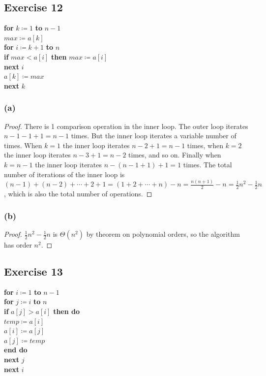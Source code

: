 \documentclass[14pt]{extarticle}
\begin{document}
\subsection{Exercise 12}
\begin{tabbing}
{\bf for} \= \(k \coloneqq 1\) {\bf to} \(n-1\) \\
          \> \(max \coloneqq a[k]\) \\
          \> {\bf for} \= \(i \coloneqq k+1\) {\bf to} \(n\)\\
          \>           \> {\bf if} \(max < a[i]\) {\bf then} \(max \coloneqq a[i]\) \\
          \> {\bf next} \(i\) \\
\(a[k] \coloneqq max\) \\
{\bf next} \(k\)
\end{tabbing}

\subsubsection{(a)}
\begin{proof}
There is 1 comparison operation in the inner loop. The outer loop iterates \(n-1-1+1 = n-1\) times. But the inner loop
iterates a variable number of times. When \(k=1\) the inner loop iterates \(n-2+1 = n-1\) times, when \(k=2\) the inner 
loop iterates \(n-3+1 = n-2\) times, and so on. Finally when \(k=n-1\) the inner loop iterates \(n-(n-1+1)+1 = 1\) times.
The total number of iterations of the inner loop is \((n-1) + (n-2) + \cdots + 2 + 1 = (1+2+ \cdots + n) - n = 
\frac{n(n+1)}{2} - n = \frac{1}{2}n^2 - \frac{1}{2}n\), which is also the total number of operations.
\end{proof}

\subsubsection{(b)}
\begin{proof}
\(\frac{1}{2}n^2 - \frac{1}{2}n\) is \(\Theta(n^2)\) by theorem on polynomial orders, so the algorithm has order 
\(n^2\).
\end{proof}

\subsection{Exercise 13}
\begin{tabbing}
{\bf for} \= \(i \coloneqq 1\) {\bf to} \(n-1\) \\
          \> {\bf for} \= \(j \coloneqq i\) {\bf to} \(n\)\\
          \>           \> {\bf if} \= \(a[j] > a[i]\) {\bf then do} \\
          \>           \>          \>\(temp \coloneqq a[i]\)\\
          \>           \>          \>\(a[i] \coloneqq a[j]\)\\
          \>           \>          \>\(a[j] \coloneqq temp\)\\
          \>           \> {\bf end do} \\
          \> {\bf next} \(j\) \\
{\bf next} \(i\)
\end{tabbing}
\end{document}
